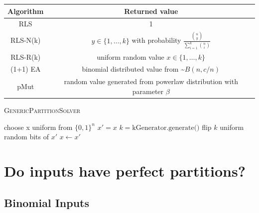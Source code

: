 \begin{tabular}{c c}
      Algorithm & Returned value                                                                          \\
      \hline
      RLS       & 1                                                                                       \\
      RLS-N(k)  & $y \in \{1,\dots,k\}$ with probability $\frac{\binom{n}{y}}{\sum_{i=1}^k \binom{n}{i}}$ \\
      RLS-R(k)  & uniform random value $x \in \{1,\dots,k\}$                                              \\
      (1+1) EA  & binomial distributed value from \textasciitilde$B(n,c/n)$                               \\
      pMut      & random value generated from powerlaw distribution with parameter $\beta$                \\
\end{tabular}



\begin{algorithm}[bt]
      \caption{\textsc{GenericPartitionSolver}}\label{alg:genericPartition}

      \DontPrintSemicolon %

      \BlankLine
      choose x uniform from ${\{0,1\}}^n$\;
      {
      $x' = x$\;
      $k = \text{kGenerator.generate()}$\;
      flip $k$ uniform random bits of $x'$\;
      {
      {
            $x \leftarrow x'$\;
      }
      }
      }
\end{algorithm}

\section{Do inputs have perfect partitions?}
\subsection{Binomial Inputs}

